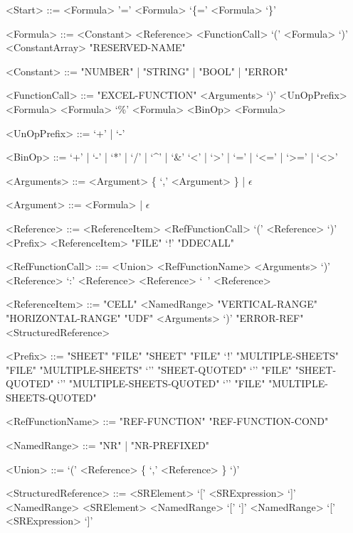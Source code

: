 \begin{grammar}
<Start> ::= <Formula>
	\alt '=' <Formula>
	\alt `\{=' <Formula> `\}'

<Formula> ::= <Constant>
         \alt <Reference>
         \alt <FunctionCall>
         \alt `(' <Formula> `)'
         \alt <ConstantArray>
         \alt "RESERVED-NAME"
         
<Constant> ::= "NUMBER" | "STRING" | "BOOL" | "ERROR"
         
<FunctionCall> ::= "EXCEL-FUNCTION" <Arguments> `)'
		\alt <UnOpPrefix> <Formula>
		\alt <Formula> `\%'
		\alt <Formula> <BinOp> <Formula>
		
<UnOpPrefix> ::= `+' | `-'

<BinOp> ::= `+' | `-' | `*' | `/' | `\textasciicircum' | `\&'
	\alt `<' | `>' | `=' | `<=' | `>=' | `<>'

	
<Arguments> ::= <Argument> \{ `,' <Argument> \} | $\epsilon$

<Argument> ::= <Formula> | $\epsilon$

<Reference> ::= <ReferenceItem>
    \alt <RefFunctionCall>
	\alt `(' <Reference> `)' 
	\alt <Prefix> <ReferenceItem>
	\alt "FILE" `!' "DDECALL"

<RefFunctionCall> ::= <Union>
    \alt <RefFunctionName> <Arguments> `)'
    \alt <Reference> `:' <Reference>
	\alt <Reference> `\ ' <Reference>
    
<ReferenceItem> ::= "CELL"
	\alt <NamedRange>
	\alt "VERTICAL-RANGE"
	\alt "HORIZONTAL-RANGE"
	\alt "UDF" <Arguments> `)'
	\alt "ERROR-REF"
	\alt <StructuredReference>
	
<Prefix> ::= "SHEET"
	\alt "FILE" "SHEET"
	\alt "FILE" `!'
	\alt "MULTIPLE-SHEETS"
	\alt "FILE" "MULTIPLE-SHEETS"
	\alt `'' "SHEET-QUOTED"
	\alt `'' "FILE" "SHEET-QUOTED"
	\alt `'' "MULTIPLE-SHEETS-QUOTED"
	\alt `'' "FILE" "MULTIPLE-SHEETS-QUOTED"

<RefFunctionName> ::= "REF-FUNCTION"
			\alt "REF-FUNCTION-COND"
	
<NamedRange> ::= "NR" | "NR-PREFIXED"

<Union> ::= `(' <Reference> \{ `,' <Reference> \} `)'

<StructuredReference> ::= <SRElement>
	\alt `[' <SRExpression> `]'
	\alt <NamedRange> <SRElement>
	\alt <NamedRange> `[' `]'
	\alt <NamedRange> `[' <SRExpression> `]'



\end{grammar}
